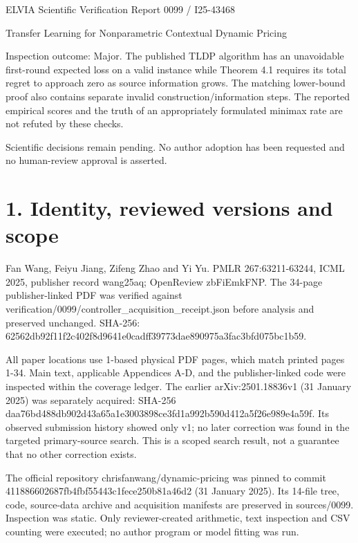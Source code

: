 \documentclass[10pt]{article}
\begin{document}
ELVIA Scientific Verification Report
0099 / I25-43468\par
Transfer Learning for Nonparametric Contextual Dynamic Pricing\par
Inspection outcome: Major. The published TLDP algorithm has an unavoidable first-round expected loss on a valid instance while Theorem 4.1 requires its total regret to approach zero as source information grows. The matching lower-bound proof also contains separate invalid construction/information steps. The reported empirical scores and the truth of an appropriately formulated minimax rate are not refuted by these checks.\par
Scientific decisions remain pending. No author adoption has been requested and no human-review approval is asserted.\par
\section*{1. Identity, reviewed versions and scope}
Fan Wang, Feiyu Jiang, Zifeng Zhao and Yi Yu. PMLR 267:63211-63244, ICML 2025, publisher record wang25aq; OpenReview zbFiEmkFNP. The 34-page publisher-linked PDF was verified against verification/0099/controller\_acquisition\_receipt.json before analysis and preserved unchanged. SHA-256: 62562db92f11f2c402f8d9641e0cadff39773dae890975a3fac3bfd075bc1b59.\par
All paper locations use 1-based physical PDF pages, which match printed pages 1-34. Main text, applicable Appendices A-D, and the publisher-linked code were inspected within the coverage ledger. The earlier arXiv:2501.18836v1 (31 January 2025) was separately acquired: SHA-256 daa76bd488db902d43a65a1e3003898ce3fd1a992b590d412a5f26e989e4a59f. Its observed submission history showed only v1; no later correction was found in the targeted primary-source search. This is a scoped search result, not a guarantee that no other correction exists.\par
The official repository chrisfanwang/dynamic-pricing was pinned to commit 411886602687fb4fbf55443c1fece250b81a46d2 (31 January 2025). Its 14-file tree, code, source-data archive and acquisition manifests are preserved in sources/0099. Inspection was static. Only reviewer-created arithmetic, text inspection and CSV counting were executed; no author program or model fitting was run.\par
\end{document}
